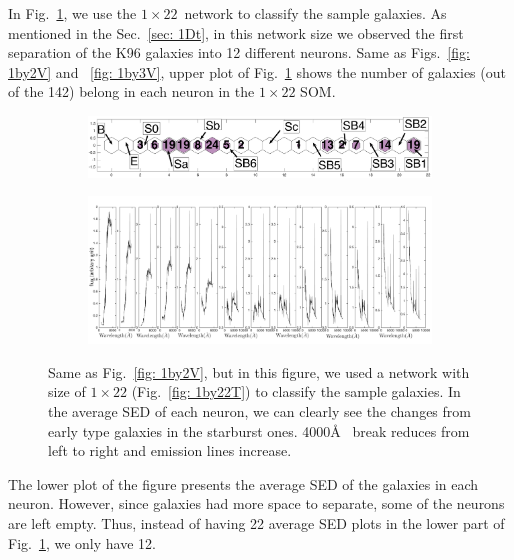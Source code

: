             In Fig.~\ref{fig: 1by22V}, we use the $1\times22$~network to classify the sample galaxies.
            As mentioned in the Sec.~\ref{sec: 1Dt}, in this network size we observed the first separation of the K96 galaxies into 12 different neurons.
            Same as Figs.~\ref{fig: 1by2V} and ~\ref{fig: 1by3V}, upper plot of Fig.~\ref{fig: 1by22V} shows the number of galaxies (out of the 142) belong in each neuron in the $1\times22$ SOM.
            \begin{figure}
                \begin{subfigure}[b]{0.9\textwidth}
                    \centering
                    \includegraphics[width=\textwidth]{images0.01/1d/hit_v_1_by_22_n.png}
                \end{subfigure}
                \hfill
                \begin{subfigure}[b]{0.9\textwidth}
                     \includegraphics[width=\textwidth]{images0.01/1d/SED_total1by22.png}
                \end{subfigure}
                \caption{Same as Fig.~\ref{fig: 1by2V}, but in this figure, we used a network with size of $1\times22$ (Fig.~\ref{fig: 1by22T}) to classify the sample galaxies. In the average SED of each neuron, we can clearly see the changes from early type galaxies in the starburst ones. 4000\AA~ break reduces from left to right and emission lines increase.}
                \label{fig: 1by22V}
            \end{figure}
            The lower plot of the figure presents the average SED of the galaxies in each neuron.
            However, since galaxies had more space to separate, some of the neurons are left empty.
            Thus, instead of having 22 average SED plots in the lower part of Fig.~\ref{fig: 1by22V}, we only have 12.
            
